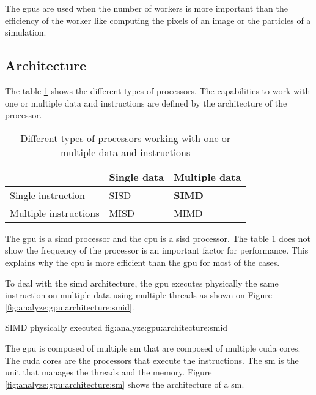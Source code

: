 The \acrshort{gpu}s are used when the number of workers is more important than
the efficiency of the worker like computing the pixels of an image or the
particles of a simulation.




\subsection{Architecture}
\label{ch:analyze:gpu:architecture}

The table \ref{tab:analyze:gpu:architecture:instruction-data} shows the
different types of processors.
The capabilities to work with one or multiple data and instructions are defined
by the architecture of the processor.

\begin{table}[ht]
    \centering
    \begin{tabular}{l|l|l|}
                          & Single data & Multiple data \\ \hline
    Single instruction    & SISD        & \textbf{SIMD}  \\ \hline
    Multiple instructions & MISD        & MIMD           \\ \hline
    \end{tabular}
    \caption{Different types of processors working with one or multiple data and instructions}
    \label{tab:analyze:gpu:architecture:instruction-data}
\end{table}

The \acrshort{gpu} is a \acrshort{simd} processor and the \acrshort{cpu} is a
\acrshort{sisd} processor.
The table \ref{tab:analyze:gpu:architecture:instruction-data} does not show the
frequency of the processor is an important factor for performance.
This explains why the \acrshort{cpu} is more efficient than the \acrshort{gpu}
for most of the cases.

To deal with the \acrshort{simd} architecture, the \acrshort{gpu} executes
physically the same instruction on multiple data using multiple threads as shown
on Figure \ref{fig:analyze:gpu:architecture:smid}.

{SIMD physically executed}
{fig:analyze:gpu:architecture:smid}

The \acrshort{gpu} is composed of multiple \acrfull{sm} that are composed of
multiple \acrfull{cuda} cores.
The \acrshort{cuda} cores are the processors that execute the instructions.
The \acrshort{sm} is the unit that manages the threads and the memory.
Figure \ref{fig:analyze:gpu:architecture:sm} shows the architecture of a \acrshort{sm}.


